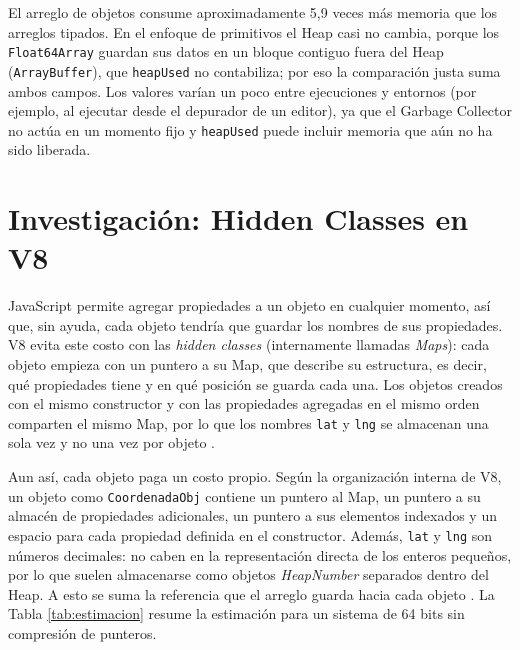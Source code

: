 \documentclass[11pt]{article}
\newcommand{\razon}{5{,}9}        %
\begin{document}
El arreglo de objetos consume aproximadamente \razon{} veces más memoria que los arreglos tipados. En el enfoque de primitivos el Heap casi no cambia, porque los \texttt{Float64Array} guardan sus datos en un bloque contiguo fuera del Heap (\texttt{ArrayBuffer}), que \texttt{heapUsed} no contabiliza; por eso la comparación justa suma ambos campos. Los valores varían un poco entre ejecuciones y entornos (por ejemplo, al ejecutar desde el depurador de un editor), ya que el Garbage Collector no actúa en un momento fijo y \texttt{heapUsed} puede incluir memoria que aún no ha sido liberada.

\section{Investigación: Hidden Classes en V8}

JavaScript permite agregar propiedades a un objeto en cualquier momento, así que, sin ayuda, cada objeto tendría que guardar los nombres de sus propiedades. V8 evita este costo con las \textit{hidden classes} (internamente llamadas \textit{Maps}): cada objeto empieza con un puntero a su Map, que describe su estructura, es decir, qué propiedades tiene y en qué posición se guarda cada una. Los objetos creados con el mismo constructor y con las propiedades agregadas en el mismo orden comparten el mismo Map, por lo que los nombres \texttt{lat} y \texttt{lng} se almacenan una sola vez y no una vez por objeto \parencite{v8hidden}.

Aun así, cada objeto paga un costo propio. Según la organización interna de V8, un objeto como \texttt{CoordenadaObj} contiene un puntero al Map, un puntero a su almacén de propiedades adicionales, un puntero a sus elementos indexados y un espacio para cada propiedad definida en el constructor. Además, \texttt{lat} y \texttt{lng} son números decimales: no caben en la representación directa de los enteros pequeños, por lo que suelen almacenarse como objetos \textit{HeapNumber} separados dentro del Heap. A esto se suma la referencia que el arreglo guarda hacia cada objeto \parencite{mdnmemory}. La Tabla \ref{tab:estimacion} resume la estimación para un sistema de 64 bits sin compresión de punteros.
\end{document}
